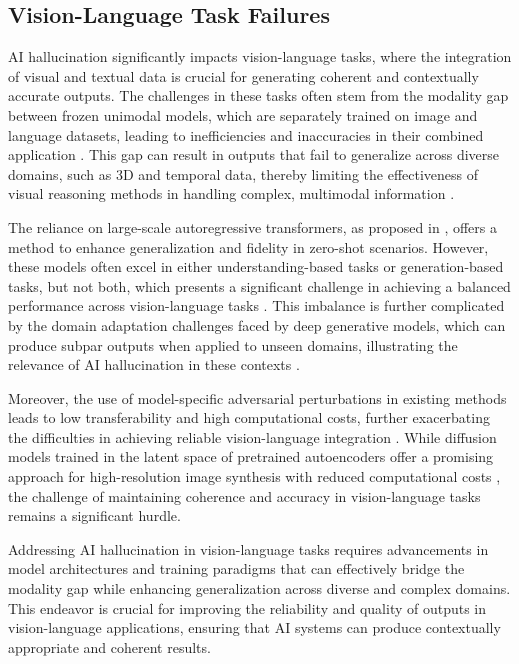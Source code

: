 \subsection{Vision-Language Task Failures} \label{subsec:Vision-Language Task Failures}

AI hallucination significantly impacts vision-language tasks, where the integration of visual and textual data is crucial for generating coherent and contextually accurate outputs. The challenges in these tasks often stem from the modality gap between frozen unimodal models, which are separately trained on image and language datasets, leading to inefficiencies and inaccuracies in their combined application \cite{li2023blip}. This gap can result in outputs that fail to generalize across diverse domains, such as 3D and temporal data, thereby limiting the effectiveness of visual reasoning methods in handling complex, multimodal information \cite{hsu2023whatsleftconceptgrounding}.



The reliance on large-scale autoregressive transformers, as proposed in \cite{ramesh2021zero}, offers a method to enhance generalization and fidelity in zero-shot scenarios. However, these models often excel in either understanding-based tasks or generation-based tasks, but not both, which presents a significant challenge in achieving a balanced performance across vision-language tasks \cite{BLIP:Boots6}. This imbalance is further complicated by the domain adaptation challenges faced by deep generative models, which can produce subpar outputs when applied to unseen domains, illustrating the relevance of AI hallucination in these contexts \cite{park2023domainadaptationbasedhuman}.



Moreover, the use of model-specific adversarial perturbations in existing methods leads to low transferability and high computational costs, further exacerbating the difficulties in achieving reliable vision-language integration \cite{zhang2024universaladversarialperturbationsvisionlanguage}. While diffusion models trained in the latent space of pretrained autoencoders offer a promising approach for high-resolution image synthesis with reduced computational costs \cite{rombach2022high}, the challenge of maintaining coherence and accuracy in vision-language tasks remains a significant hurdle.



Addressing AI hallucination in vision-language tasks requires advancements in model architectures and training paradigms that can effectively bridge the modality gap while enhancing generalization across diverse and complex domains. This endeavor is crucial for improving the reliability and quality of outputs in vision-language applications, ensuring that AI systems can produce contextually appropriate and coherent results.



